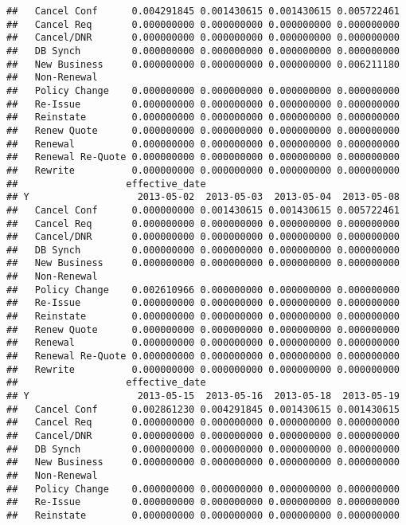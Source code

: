 \documentclass[]{article}
\begin{document}
\begin{verbatim}
##   Cancel Conf      0.004291845 0.001430615 0.001430615 0.005722461
##   Cancel Req       0.000000000 0.000000000 0.000000000 0.000000000
##   Cancel/DNR       0.000000000 0.000000000 0.000000000 0.000000000
##   DB Synch         0.000000000 0.000000000 0.000000000 0.000000000
##   New Business     0.000000000 0.000000000 0.000000000 0.006211180
##   Non-Renewal                                                     
##   Policy Change    0.000000000 0.000000000 0.000000000 0.000000000
##   Re-Issue         0.000000000 0.000000000 0.000000000 0.000000000
##   Reinstate        0.000000000 0.000000000 0.000000000 0.000000000
##   Renew Quote      0.000000000 0.000000000 0.000000000 0.000000000
##   Renewal          0.000000000 0.000000000 0.000000000 0.000000000
##   Renewal Re-Quote 0.000000000 0.000000000 0.000000000 0.000000000
##   Rewrite          0.000000000 0.000000000 0.000000000 0.000000000
##                   effective_date
## Y                   2013-05-02  2013-05-03  2013-05-04  2013-05-08
##   Cancel Conf      0.000000000 0.001430615 0.001430615 0.005722461
##   Cancel Req       0.000000000 0.000000000 0.000000000 0.000000000
##   Cancel/DNR       0.000000000 0.000000000 0.000000000 0.000000000
##   DB Synch         0.000000000 0.000000000 0.000000000 0.000000000
##   New Business     0.000000000 0.000000000 0.000000000 0.000000000
##   Non-Renewal                                                     
##   Policy Change    0.002610966 0.000000000 0.000000000 0.000000000
##   Re-Issue         0.000000000 0.000000000 0.000000000 0.000000000
##   Reinstate        0.000000000 0.000000000 0.000000000 0.000000000
##   Renew Quote      0.000000000 0.000000000 0.000000000 0.000000000
##   Renewal          0.000000000 0.000000000 0.000000000 0.000000000
##   Renewal Re-Quote 0.000000000 0.000000000 0.000000000 0.000000000
##   Rewrite          0.000000000 0.000000000 0.000000000 0.000000000
##                   effective_date
## Y                   2013-05-15  2013-05-16  2013-05-18  2013-05-19
##   Cancel Conf      0.002861230 0.004291845 0.001430615 0.001430615
##   Cancel Req       0.000000000 0.000000000 0.000000000 0.000000000
##   Cancel/DNR       0.000000000 0.000000000 0.000000000 0.000000000
##   DB Synch         0.000000000 0.000000000 0.000000000 0.000000000
##   New Business     0.000000000 0.000000000 0.000000000 0.000000000
##   Non-Renewal                                                     
##   Policy Change    0.000000000 0.000000000 0.000000000 0.000000000
##   Re-Issue         0.000000000 0.000000000 0.000000000 0.000000000
##   Reinstate        0.000000000 0.000000000 0.000000000 0.000000000

\end{verbatim}
\end{document}
